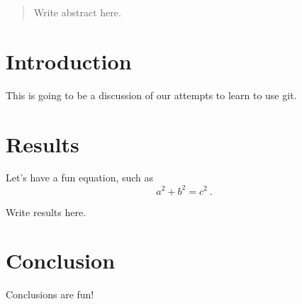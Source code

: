 \documentclass{article}
\begin{document}
\begin{abstract}
Write abstract here.
\end{abstract}

\section{Introduction}

This is going to be a discussion of our attempts to learn to use git.

\section{Results}

Let's have a fun equation, such as
\begin{equation}
a^2 + b^2 = c^2~.
\end{equation}

Write results here.

\section{Conclusion}

Conclusions are fun!
\end{document}
